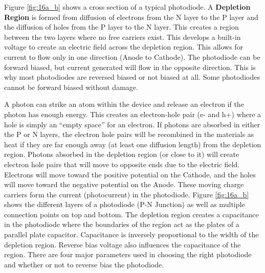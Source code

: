 \documentclass[main.tex]{subfiles}
\begin{document}
\begin{enumerate}
\begin{enumerate}
        Figure \ref{fig:16a_b} shows a cross section of a typical photodiode. A \textbf{Depletion Region} is formed from diffusion of electrons from the N layer to the P layer and the diffusion of holes from the P layer to the N layer. This creates a region between the two layers where no free carriers exist. This develops a built-in voltage to create an electric field across the depletion region. This allows for current to flow only in one direction (Anode to Cathode). The photodiode can be forward biased, but current generated will flow in the opposite direction. This is why most photodiodes are reversed biased or not biased at all. Some photodiodes cannot be forward biased without damage.

        A photon can strike an atom within the device and release an electron if the photon has enough energy. This creates an electron-hole pair (e- and h+) where a hole is simply an “empty space” for an electron. If photons are absorbed in either the P or N layers, the electron hole pairs will be recombined in the materials as heat if they are far enough away (at least one diffusion length) from the depletion region. Photons absorbed in the depletion region (or close to it) will create electron hole pairs that will move to opposite ends due to the electric field. Electrons will move toward the positive potential on the Cathode, and the holes will move toward the negative potential on the Anode. These moving charge carriers form the current (photocurrent) in the photodiode. Figure \ref{fig:16a_b} shows the different layers of a photodiode (P-N Junction) as well as multiple connection points on top and bottom. The depletion region creates a capacitance in the photodiode where the boundaries of the region act as the plates of a parallel plate capacitor. Capacitance is inversely proportional to the width of the depletion region. Reverse bias voltage also influences the capacitance of the region. There are four major parameters used in choosing the right photodiode and whether or not to reverse bias the photodiode.


\end{enumerate}
\end{enumerate}
\end{document}
